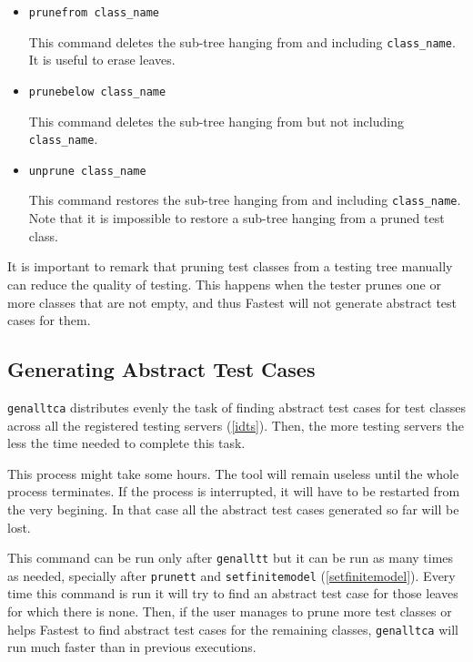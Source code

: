 \begin{itemize}
\item \verb+prunefrom class_name+

This command deletes the sub-tree hanging from and including \verb+class_name+. It is useful to erase leaves.

\item \verb+prunebelow class_name+

This command deletes the sub-tree hanging from but not including \verb+class_name+.

\item \verb+unprune class_name+

This command restores the sub-tree hanging from and including \verb+class_name+. Note that it is impossible to restore a sub-tree hanging from a pruned test class.
\end{itemize}

It is important to remark that pruning test classes from a testing tree manually can reduce the quality of testing. This happens when the tester prunes one or more classes that are not empty, and thus Fastest will not generate abstract test cases for them.


\subsection{\label{genalltca}Generating Abstract Test Cases}

\verb+genalltca+ distributes evenly the task of finding abstract test cases for test classes across all the registered testing servers (\ref{idts}). Then, the more testing servers the less the time needed to complete this task.

\vspace{5mm} This process might take some hours. The tool will remain useless until the whole process terminates. If  the process is interrupted, it will have to be restarted from the very begining. In that case all the abstract test cases generated so far will be lost. \vspace{5mm}

This command can be run only after \verb+genalltt+ but it can be run as many times as needed, specially after \verb+prunett+ and \verb+setfinitemodel+ (\ref{setfinitemodel}). Every time this command is run it will try to find an abstract test case for those leaves for which there is none. Then, if the user manages to prune more test classes or helps Fastest to find abstract test cases for the remaining classes, \verb+genalltca+ will run much faster than in previous executions.


